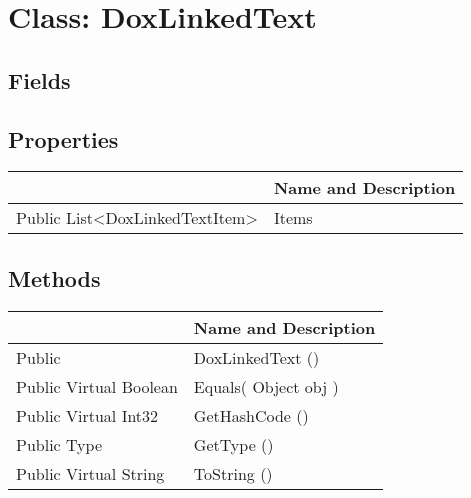 \documentclass[11pt, oneside, a4paper]{book}
\begin{document}
\hypertarget{SoftwareEngineeringTools.{}Documentation.{}DoxLinkedText}{}
\section{Class: DoxLinkedText}

\subsection{Fields}

\subsection{Properties}
\begin{center}
\begin{tabular}{| p{3cm} | p{12cm} | }
\hline
\textbf{ } & \textbf{ Name and Description}\\
\hline
 Public  List<DoxLinkedTextItem> &  Items\hypertarget{SoftwareEngineeringTools.{}Documentation.{}DoxLinkedText.{}Items}{}\\
\hline
\end{tabular}
\end{center}

\subsection{Methods}
\begin{center}
\begin{tabular}{| p{3cm} | p{12cm} | }
\hline
\textbf{ } & \textbf{ Name and Description}\\
\hline
 Public  &  DoxLinkedText ()\hypertarget{SoftwareEngineeringTools.{}Documentation.{}DoxLinkedText.{}DoxLinkedText}{}\\
\hline
 Public  Virtual  Boolean &  Equals(\hypertarget{SoftwareEngineeringTools.{}Documentation.{}DoxLinkedText.{}Equals\_Object}{} Object  obj  )\\
\hline
 Public  Virtual  Int32 &  GetHashCode ()\hypertarget{SoftwareEngineeringTools.{}Documentation.{}DoxLinkedText.{}GetHashCode}{}\\
\hline
 Public  Type &  GetType ()\hypertarget{SoftwareEngineeringTools.{}Documentation.{}DoxLinkedText.{}GetType}{}\\
\hline
 Public  Virtual  String &  ToString ()\hypertarget{SoftwareEngineeringTools.{}Documentation.{}DoxLinkedText.{}ToString}{}\\
\hline
\end{tabular}
\end{center}
 
\end{document}

